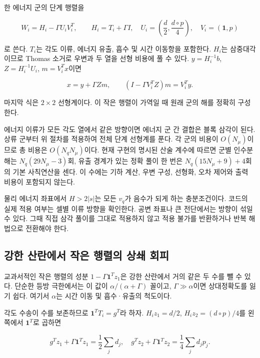 \documentclass[
  10pt,
  a4paper,
]{article}
\begin{document}
한 에너지 군의 단계 행렬을

\[
W_i=H_i-\Gamma U_iV_i^T,\qquad H_i=T_i+\Gamma I,
\quad U_i=\left(\frac d2,\frac{d\circ p}{4}\right),
\quad V_i=(\mathbf1,p)
\]

로 쓴다. \(T_i\)는 각도 이류, 에너지 유출, 흡수 및 시간 이동항을
포함한다. \(H_i\)는 삼중대각이므로 Thomas 소거로 우변과 두 열을 선형
비용에 풀 수 있다. \(y=H_i^{-1}b\), \(Z=H_i^{-1}U_i\), \(m=V_i^Tx\)이면

\[
x=y+\Gamma Zm,\qquad
(I-\Gamma V_i^TZ)m=V_i^Ty.
\]

마지막 식은 \(2\times2\) 선형계이다. 이 작은 행렬이 가역일 때 원래 군의
해를 정확히 구성한다.

에너지 이류가 모든 각도 열에서 같은 방향이면 에너지 군 간 결합은 블록
삼각이 된다. 상류 군부터 위 절차를 적용하여 전체 단계 선형계를 푼다. 각
군의 비용이 \(O(N_\mu)\)이므로 총 비용은 \(O(N_qN_\mu)\)이다. 현재
구현의 명시된 산술 계수에 따르면 군별 인수분해는 \(N_q(29N_\mu-3)\)회,
유출 경계가 있는 정확 풀이 한 번은 \(N_q(15N_\mu+9)+4\)회의 기본
사칙연산을 센다. 이 수에는 기하 계산, 우변 구성, 선형화, 오차 제어와
출력 비용이 포함되지 않는다.

물리 에너지 좌표에서 \(H>2|s|\)는 모든 \(v_q\)가 음수가 되게 하는
충분조건이다. 코드의 실제 적용 여부는 셀별 이류 방향을 확인한다. 공변
좌표나 큰 전단에서는 방향이 섞일 수 있다. 그때 직접 삼각 풀이를 그대로
적용하지 않고 적용 불가를 반환하거나 반복 해법으로 전환해야 한다.

\hypertarget{uxac15uxd55c-uxc0b0uxb780uxc5d0uxc11c-uxc791uxc740-uxd589uxb82cuxc758-uxc0c1uxc1c4-uxd68cuxd53c}{%
\subsection{강한 산란에서 작은 행렬의 상쇄
회피}\label{uxac15uxd55c-uxc0b0uxb780uxc5d0uxc11c-uxc791uxc740-uxd589uxb82cuxc758-uxc0c1uxc1c4-uxd68cuxd53c}}

교과서적인 작은 행렬의 성분 \(1-\Gamma\mathbf1^Tz_1\)은 강한 산란에서
거의 같은 두 수를 뺄 수 있다. 단순한 등방 극한에서는 이 값이
\(\alpha/(\alpha+\Gamma)\) 꼴이고, \(\Gamma\gg\alpha\)이면 상대정확도를
잃기 쉽다. 여기서 \(\alpha\)는 시간 이동 및 흡수·유출의 척도이다.

각도 수송이 수를 보존하므로 \(\mathbf1^TT_i=g^T\)라 하자.
\(H_iz_1=d/2\), \(H_iz_2=(d\circ p)/4\)를 왼쪽에서 \(\mathbf1^T\)로
곱하면

\[
g^Tz_1+\Gamma\mathbf1^Tz_1=\frac12\sum_jd_j,
\quad
g^Tz_2+\Gamma\mathbf1^Tz_2=\frac14\sum_jd_jp_j.
\]
\end{document}
